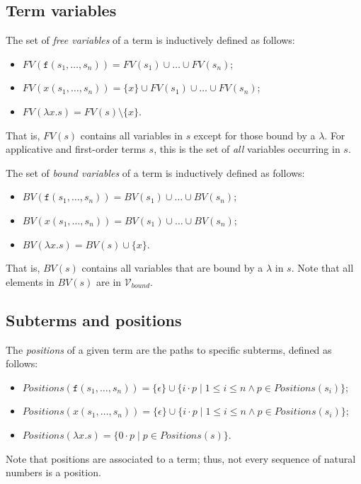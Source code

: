 \documentclass{lmcs}
\theoremstyle{theorem}\newtheorem{theorem}{Theorem}
\theoremstyle{theorem}\newtheorem{lemma}[theorem]{Lemma}
\theoremstyle{theorem}\newtheorem{corollary}[theorem]{Corollary}
\theoremstyle{definition}\newtheorem{definition}[theorem]{Definition}
\theoremstyle{definition}\newtheorem{example}[theorem]{Example}
\newcommand{\Vbound}{\mathcal{V}_{\mathit{bound}}}
\newcommand{\FV}{\mathit{FV}}
\newcommand{\BV}{\mathit{BV}}
\newcommand{\Positions}{\mathit{Positions}}
\newcommand{\identifier}[1]{\mathtt{#1}}
\newcommand{\afun}{\identifier{f}}
\newcommand{\avar}{x}
\newcommand{\abs}[2]{\lambda #1.#2}
\begin{document}
\subsection{Term variables}
The set of \emph{free variables} of a term is inductively defined as follows:
\begin{itemize}
\item $\FV(\afun(s_1,\dots,s_n)) = \FV(s_1) \cup \dots \cup \FV(s_n)$;
\item $\FV(\avar(s_1,\dots,s_n)) = \{ \avar \} \cup \FV(s_1) \cup \dots \cup \FV(s_n)$;
\item $\FV(\abs{\avar}{s}) = \FV(s) \setminus \{ \avar \}$.
\end{itemize}
That is, $\FV(s)$ contains all variables in $s$ except for those bound by a $\lambda$.
For applicative and first-order terms $s$, this is the set of \emph{all} variables occurring in
$s$.

The set of \emph{bound variables} of a term is inductively defined as follows:
\begin{itemize}
\item $\BV(\afun(s_1,\dots,s_n)) = \BV(s_1) \cup \dots \cup \BV(s_n)$;
\item $\BV(\avar(s_1,\dots,s_n)) = \BV(s_1) \cup \dots \cup \BV(s_n)$;
\item $\BV(\abs{\avar}{s}) = \BV(s) \cup \{ \avar \}$.
\end{itemize}
That is, $\BV(s)$ contains all variables that are bound by a $\lambda$ in $s$.  Note that all
elements in $\BV(s)$ are in $\Vbound$.

\subsection{Subterms and positions}

The \emph{positions} of a given term are the paths to specific subterms, defined as follows:

\begin{itemize}
\item $\Positions(\afun(s_1,\dots,s_n)) = \{ \epsilon \} \cup \{ i \cdot p \mid 1 \leq i
  \leq n \wedge p \in \mathit{Positions}(s_i) \}$;
\item $\Positions(\avar(s_1,\dots,s_n)) = \{ \epsilon \} \cup \{ i \cdot p \mid 1 \leq i
  \leq n \wedge p \in \Positions(s_i) \}$;
\item $\Positions(\abs{\avar}{s}) = \{ 0 \cdot p \mid p \in \Positions(s) \}$.
\end{itemize}
Note that positions are associated to a term; thus, not every sequence of natural numbers is a
position.
\end{document}
